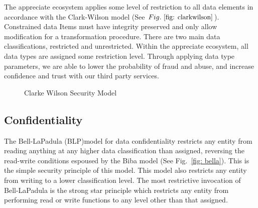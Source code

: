 \documentclass[a4paper,onecolumn, 10.5pt]{article}
\begin{document}
The appreciate ecosystem applies some level of restriction to all data elements in accordance with the Clark-Wilson model (See \(Fig.~\ref{fig: clarkwilson} \)). Constrained data Items must have integrity preserved and only allow modification for a transformation procedure. There are two main data classifications, restricted and unrestricted. Within the appreciate ecosystem, all data types are assigned some restriction level. Through applying data type parameters, we are able to lower the probability of fraud and abuse, and increase confidence and trust with our third party services. 


\begin{figure}[!htb]
	\centering %
	\caption{Clarke Wilson Security Model}
	\label{fig: clarkwilson}
\end{figure}


\subsection{Confidentiality}
The Bell-LaPadula (BLP)\cite{securecomp}model for data confidentiality restricts any entity from reading anything at any higher data classification than assigned, reversing the read-write conditions espoused by the Biba model (See Fig.~\ref{fig: bella}).  This is the simple security principle of this model. This model also restricts any entity from writing to a lower classification level. The most restrictive invocation of Bell-LaPadula is the strong star principle which restricts any entity from performing read or write functions to any level other than that assigned.
\end{document}
